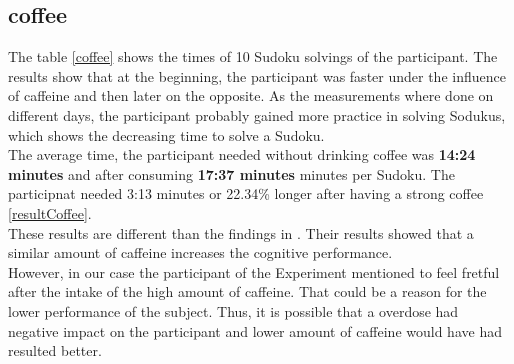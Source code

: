 \subsection{coffee}
The table \ref{coffee} shows the times of 10 Sudoku solvings of the participant. The results show that at the beginning, the participant was faster under the influence of caffeine and then later on the opposite. As the measurements where done on different days, the participant probably gained more practice in solving Sodukus, which shows the decreasing time to solve a Sudoku.
\\
The average time, the participant needed without drinking coffee was \textbf{14:24 minutes} and after consuming \textbf{17:37 minutes} minutes per Sudoku. The participnat needed 3:13 minutes or 22.34\%  longer after having a strong coffee \ref{resultCoffee}.\\
These results are different than the findings in \cite{liguori1997absorption}. Their results showed that a similar amount of caffeine increases the cognitive performance. \\
However, in our case the participant of the Experiment mentioned to feel fretful after the intake of the high amount of caffeine. That could be a reason for the lower performance of the subject. Thus, it is possible that a overdose had negative impact on the participant and lower amount of caffeine would have had resulted better. 

\FloatBarrier

